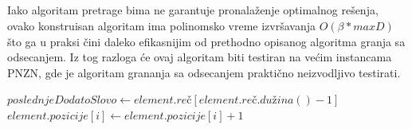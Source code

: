 \documentclass[12pt,oneside]{memoir}
\begin{document}
\begin{algorithm}
  \caption{$\textrm{RedukujBim}(\mathcal{B}\textrm{, }prona\textrm{đ}enaNadniska)$}
  \label{alg:redukujbim}
  \end{algorithm}
\\
\\
\\
\\
Iako algoritam pretrage bima ne garantuje pronalaženje optimalnog rešenja, ovako konstruisan algoritam
ima polinomsko vreme izvršavanja $O(\beta*maxD)$ što ga u praksi čini daleko efikasnijim od
prethodno opisanog algoritma granja sa odsecanjem. Iz tog razloga će ovaj algoritam biti testiran na
većim instancama PNZN, gde je algoritam grananja sa odsecanjem praktično neizvodljivo testirati.
\\
\begin{algorithm}
  \caption{$\textrm{AžurirajPozicije}(element)$}
  \label{alg:azurirajPozicije}
  \begin{algorithmic}[1]
    \State $poslednjeDodatoSlovo \gets element.re\textrm{č}[element.re\textrm{č}.du\textrm{ž}ina() - 1]$
    \State
            \State $element.pozicije[i] \gets element.pozicije[i] + 1$
      \EndIf
    \EndFor
  \end{algorithmic}
  \end{algorithm}
\end{document}
